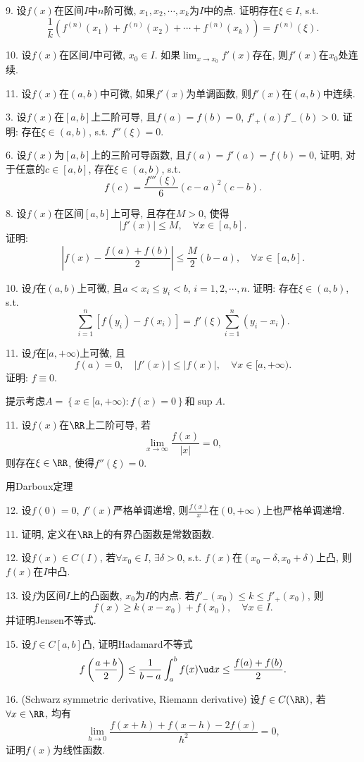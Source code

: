9. 设$f(x)$在区间$I$中$n$阶可微, $x_{1},x_{2},\cdots,x_{k}$为$I$中的点. 证明存在$\xi\in I$,
s.t.
\[
\frac{1}{k}\left(f^{(n)}(x_{1})+f^{(n)}(x_{2})+\cdots+f^{(n)}(x_{k})\right)=f^{(n)}(\xi).
\]

10. 设$f(x)$在区间$I$中可微, $x_{0}\in I$. 如果$\lim_{x\to x_{0}}f'(x)$存在,
则$f'(x)$在$x_{0}$处连续.

11. 设$f(x)$在$(a,b)$中可微, 如果$f'(x)$为单调函数, 则$f'(x)$在$(a,b)$中连续.

3. 设$f(x)$在$[a,b]$上二阶可导, 且$f(a)=f(b)=0$, $f'_{+}(a)f'_{-}(b)>0$.
证明: 存在$\xi\in(a,b)$, s.t. $f''(\xi)=0$.

6. 设$f(x)$为$[a,b]$上的三阶可导函数, 且$f(a)=f'(a)=f(b)=0$, 证明, 对于任意的$c\in[a,b]$,
存在$\xi\in(a,b)$, s.t.
\[
f(c)=\frac{f'''(\xi)}{6}(c-a)^{2}(c-b).
\]

8. 设$f(x)$在区间$[a,b]$上可导, 且存在$M>0$, 使得
\[
\left|f'(x)\right|\le M,\quad\forall x\in[a,b].
\]
证明:
\[
\left|f(x)-\frac{f(a)+f(b)}{2}\right|\le\frac{M}{2}(b-a),\quad\forall x\in[a,b].
\]

10. 设$f$在$(a,b)$上可微, 且$a<x_{i}\le y_{i}<b$, $i=1,2,\cdots,n$.
证明: 存在$\xi\in(a,b)$, s.t.
\[
\sum_{i=1}^{n}[f(y_{i})-f(x_{i})]=f'(\xi)\sum_{i=1}^{n}(y_{i}-x_{i}).
\]

11. 设$f$在$[a,+\infty)$上可微, 且
\[
f(a)=0,\quad\left|f'(x)\right|\le\left|f(x)\right|,\quad\forall x\in[a,+\infty).
\]
证明: $f\equiv0$.

提示考虑$A=\left\{ x\in[a,+\infty):f(x)=0\right\} $和$\sup A$.

11. 设$f(x)$在$\RR$上二阶可导, 若
\[
\lim_{x\to\infty}\frac{f(x)}{\left|x\right|}=0,
\]
则存在$\xi\in\RR$, 使得$f''(\xi)=0$.

用Darboux定理

12. 设$f(0)=0$, $f'(x)$严格单调递增, 则$\frac{f(x)}{x}$在$(0,+\infty)$上也严格单调递增.

11. 证明, 定义在$\RR$上的有界凸函数是常数函数.

12. 设$f(x)\in C(I)$, 若$\forall x_{0}\in I$, $\exists\delta>0$,
s.t. $f(x)$在$(x_{0}-\delta,x_{0}+\delta)$上凸, 则$f(x)$在$I$中凸.

13. 设$f$为区间$I$上的凸函数, $x_{0}$为$I$的内点. 若$f'_{-}(x_{0})\le k\le f'_{+}(x_{0})$,
则
\[
f(x)\ge k(x-x_{0})+f(x_{0}),\quad\forall x\in I.
\]
并证明Jensen不等式.

15. 设$f\in C[a,b]$凸, 证明Hadamard不等式
\[
f\left(\frac{a+b}{2}\right)\le\frac{1}{b-a}\int_{a}^{b}f(x)\ud x\le\frac{f(a)+f(b)}{2}.
\]

16. (Schwarz symmetric derivative, Riemann derivative) 设$f\in C(\RR)$,
若$\forall x\in\RR$, 均有
\[
\lim_{h\to0}\frac{f(x+h)+f(x-h)-2f(x)}{h^{2}}=0,
\]
证明$f(x)$为线性函数.

